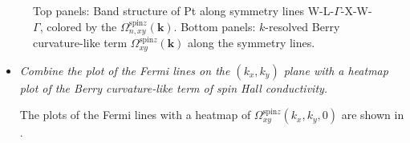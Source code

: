 \begin{figure}[htb!]
	\centering
	\qquad
	\caption{Top panels: Band structure of Pt along symmetry lines W-L-$\Gamma$-X-W-$\Gamma$, colored by
		the $\Omega_{n,xy}^{\text{spin}z}({\bm k})$.
		Bottom panels: $k$-resolved Berry curvature-like term $\Omega_{xy}^{\text{spin}z}(\bm k)$ along the symmetry lines.}
	\label{fig29.1}
\end{figure}

\begin{itemize}
	\item {\it Combine the plot of the Fermi lines on the $(k_x,k_y)$ plane with a heatmap plot of the Berry curvature-like term of spin Hall conductivity.}

	The plots of the Fermi lines with a heatmap of $\Omega_{xy}^{\text{spin}z}(k_x,k_y,0)$ are shown in .
\end{itemize}

